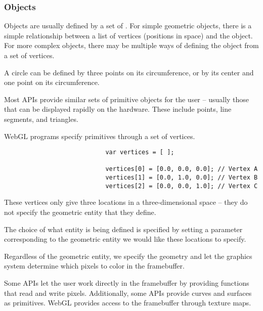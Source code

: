\documentclass[\main/notes.tex]{subfiles}
\begin{document}
				\subsubsection{Objects}
					Objects are usually defined by a set of .
					For simple geometric objects, there is a simple relationship between a list of vertices
					(positions in space)
					and the object.
					For more complex objects, there may be multiple ways of defining the object
					from a set of vertices.

					\begin{example}[Circle]
						A circle can be defined by three points on its circumference,
						or by its center and one point on its circumference.
					\end{example}

					Most APIs provide similar sets of primitive objects for the user
					-- usually those that can be displayed rapidly on the hardware.
					These include points, line segments, and triangles.

					WebGL programs specify primitives through a set of vertices.

					\begin{example}
						\begin{verbatim}
							var vertices = [ ];

							vertices[0] = [0.0, 0.0, 0.0]; // Vertex A
							vertices[1] = [0.0, 1.0, 0.0]; // Vertex B
							vertices[2] = [0.0, 0.0, 1.0]; // Vertex C
						\end{verbatim}

						These vertices only give three locations in a three-dimensional space
						-- they do not specify the geometric entity that they define.

						The choice of what entity is being defined is specified by
						setting a parameter corresponding to the geometric entity we would like these locations
						to specify.

						Regardless of the geometric entity, we specify the geometry
						and let the graphics system determine which pixels to color in the framebuffer.
					\end{example}

					Some APIs let the user work directly in the framebuffer by
					providing functions that read and write pixels.
					Additionally, some APIs provide curves and surfaces as primitives.
					WebGL provides access to the framebuffer through texture maps.
\end{document}
